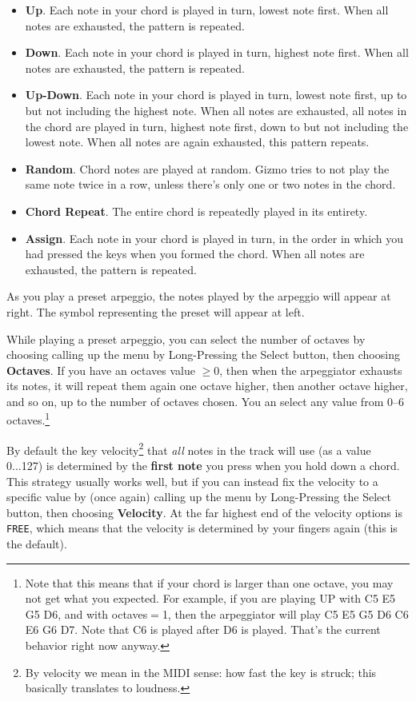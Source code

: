 \documentclass{article}
\begin{document}
\begin{itemize}
\item {\bf Up}.  Each note in your chord is played in turn, lowest note first.  When all notes are exhausted, the pattern is repeated.
\item {\bf Down}.  Each note in your chord is played in turn, highest note first.  When all notes are exhausted, the pattern is repeated.
\item {\bf Up-Down}.  Each note in your chord is played in turn, lowest note first, up to but not including the highest note.  When all notes are exhausted, all notes in the chord are played in turn, highest note first, down to but not including the lowest note.  When all notes are again exhausted, this pattern repeats.

\item {\bf Random}.  Chord notes are played at random.  Gizmo tries to not play the same note twice in a row, unless there's only one or two notes in the chord.
\item {\bf Chord Repeat}.  The entire chord is repeatedly played in its entirety.
\item {\bf Assign}. Each note in your chord is played in turn, in the order in which you had pressed the keys when you formed the chord.  When all notes are exhausted, the pattern is repeated.
\end{itemize}

As you play a preset arpeggio, the notes played by the arpeggio will appear at right.  The symbol representing the preset will appear at left.

While playing a preset arpeggio, you can select the number of octaves by choosing calling up the menu by Long-Pressing the Select button, then choosing {\bf Octaves}.  If you have an octaves value \(\geq 0\), then when the arpeggiator exhausts its notes, it will repeat them again one octave higher, then another octave higher, and so on, up to the number of octaves chosen. You an select any value from 0--6 octaves.\footnote{Note that this means that if your chord is larger than one octave, you may not get what you expected.  For example, if you are playing UP with C5 E5 G5 D6, and with octaves\(=\)1, then the arpeggiator will play C5 E5 G5 D6 C6 E6 G6 D7.  Note that C6 is played after D6 is played.  That's the current behavior right now anyway.}

By default the key velocity\footnote{By velocity we mean in the MIDI sense: how fast the key is struck; this basically translates to loudness.} that {\it all} notes in the track will use (as a value 0...127) is determined by the {\bf first note} you press when you hold down a chord.  This strategy usually works well, but if you can instead fix the velocity to a specific value by (once again) calling up the menu by Long-Pressing the Select button, then choosing {\bf Velocity}.  At the far highest end of the velocity options is \texttt{FREE}, which means that the velocity is determined by your fingers again (this is the default).
\end{document}
